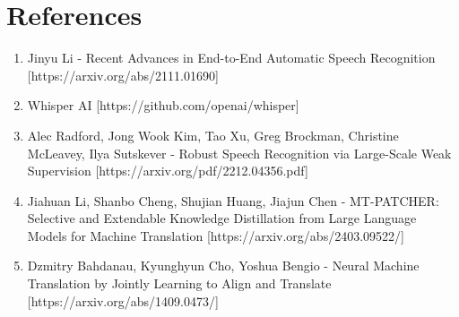 \documentclass[12px, a4paper]{article}
\begin{document}
\section{References}
\begin{enumerate}
    \item Jinyu Li - Recent Advances in End-to-End Automatic Speech Recognition [https://arxiv.org/abs/2111.01690]
    \item Whisper AI [https://github.com/openai/whisper]
    \item Alec Radford, Jong Wook Kim, Tao Xu,  Greg Brockman,  Christine McLeavey, Ilya Sutskever - Robust Speech Recognition via Large-Scale Weak Supervision [https://arxiv.org/pdf/2212.04356.pdf]
    \item Jiahuan Li, Shanbo Cheng, Shujian Huang, Jiajun Chen - MT-PATCHER: Selective and Extendable Knowledge Distillation from Large Language Models for Machine Translation [https://arxiv.org/abs/2403.09522/]
    \item Dzmitry Bahdanau, Kyunghyun Cho, Yoshua Bengio - Neural Machine Translation by Jointly Learning to Align and Translate
    [https://arxiv.org/abs/1409.0473/]
\end{enumerate}
\end{document}
